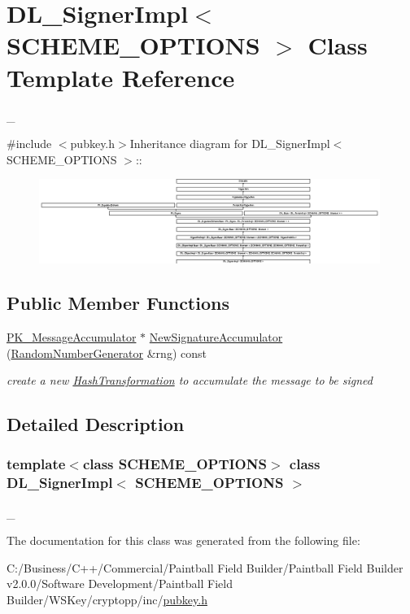\hypertarget{class_d_l___signer_impl}{
\section{DL\_\-SignerImpl$<$ SCHEME\_\-OPTIONS $>$ Class Template Reference}
\label{class_d_l___signer_impl}
}


\_\-  


{\ttfamily \#include $<$pubkey.h$>$}Inheritance diagram for DL\_\-SignerImpl$<$ SCHEME\_\-OPTIONS $>$::\begin{figure}[H]
\begin{center}
\leavevmode
\includegraphics[height=2.74877cm]{class_d_l___signer_impl}
\end{center}
\end{figure}
\subsection*{Public Member Functions}
\begin{DoxyCompactItemize}
\item 
\hypertarget{class_d_l___signer_impl_aabb709574c6f38f6d5992e88095d4298}{
\hyperlink{class_p_k___message_accumulator}{PK\_\-MessageAccumulator} $\ast$ \hyperlink{class_d_l___signer_impl_aabb709574c6f38f6d5992e88095d4298}{NewSignatureAccumulator} (\hyperlink{class_random_number_generator}{RandomNumberGenerator} \&rng) const }
\label{class_d_l___signer_impl_aabb709574c6f38f6d5992e88095d4298}

\begin{DoxyCompactList}\small\item\em create a new \hyperlink{class_hash_transformation}{HashTransformation} to accumulate the message to be signed \item\end{DoxyCompactList}\end{DoxyCompactItemize}


\subsection{Detailed Description}
\subsubsection*{template$<$class SCHEME\_\-OPTIONS$>$ class DL\_\-SignerImpl$<$ SCHEME\_\-OPTIONS $>$}

\_\- 

The documentation for this class was generated from the following file:\begin{DoxyCompactItemize}
\item 
C:/Business/C++/Commercial/Paintball Field Builder/Paintball Field Builder v2.0.0/Software Development/Paintball Field Builder/WSKey/cryptopp/inc/\hyperlink{pubkey_8h}{pubkey.h}\end{DoxyCompactItemize}
